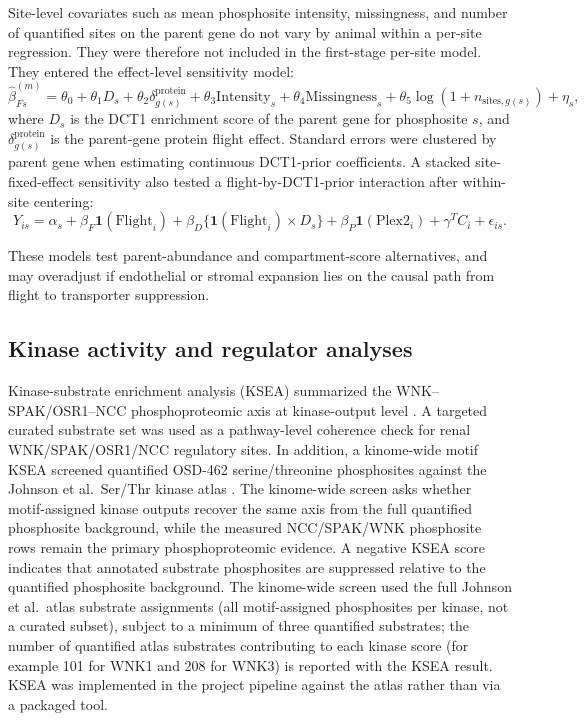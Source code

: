 \documentclass[11pt]{article}
\begin{document}
Site-level covariates such as mean phosphosite intensity, missingness, and number of quantified sites on the parent gene do not vary by animal within a per-site regression. They were therefore not included in the first-stage per-site model. They entered the effect-level sensitivity model:
\[
\hat{\beta}_{Fs}^{(m)}=\theta_0+\theta_1D_s+\theta_2\delta_{g(s)}^{\mathrm{protein}}
+\theta_3\mathrm{Intensity}_s+\theta_4\mathrm{Missingness}_s
+\theta_5\log(1+n_{\mathrm{sites},g(s)})+\eta_s,
\]
where $D_s$ is the DCT1 enrichment score of the parent gene for phosphosite $s$, and $\delta_{g(s)}^{\mathrm{protein}}$ is the parent-gene protein flight effect. Standard errors were clustered by parent gene when estimating continuous DCT1-prior coefficients. A stacked site-fixed-effect sensitivity also tested a flight-by-DCT1-prior interaction after within-site centering:
\[
Y_{is}=\alpha_s+\beta_F\mathbf{1}(\mathrm{Flight}_i)+\beta_D\{\mathbf{1}(\mathrm{Flight}_i)\times D_s\}
+\beta_P\mathbf{1}(\mathrm{Plex2}_i)+\gamma^TC_i+\epsilon_{is}.
\]

These models test parent-abundance and compartment-score alternatives, and may overadjust if endothelial or stromal expansion lies on the causal path from flight to transporter suppression.

\subsection{Kinase activity and regulator analyses}

Kinase-substrate enrichment analysis (KSEA) summarized the WNK--SPAK/OSR1--NCC phosphoproteomic axis at kinase-output level \citep{casado2013kinase}. A targeted curated substrate set was used as a pathway-level coherence check for renal WNK/SPAK/OSR1/NCC regulatory sites. In addition, a kinome-wide motif KSEA screened quantified OSD-462 serine/threonine phosphosites against the Johnson et al.\ Ser/Thr kinase atlas \citep{johnson2023atlas}. The kinome-wide screen asks whether motif-assigned kinase outputs recover the same axis from the full quantified phosphosite background, while the measured NCC/SPAK/WNK phosphosite rows remain the primary phosphoproteomic evidence. A negative KSEA score indicates that annotated substrate phosphosites are suppressed relative to the quantified phosphosite background. The kinome-wide screen used the full Johnson et al.\ atlas substrate assignments (all motif-assigned phosphosites per kinase, not a curated subset), subject to a minimum of three quantified substrates; the number of quantified atlas substrates contributing to each kinase score (for example 101 for WNK1 and 208 for WNK3) is reported with the KSEA result. KSEA was implemented in the project pipeline against the atlas rather than via a packaged tool.
\end{document}
